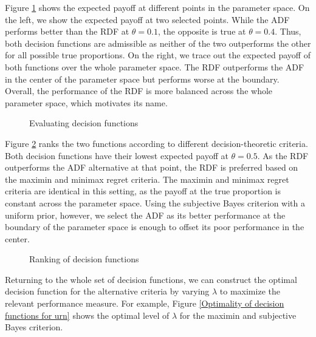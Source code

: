 Figure \ref{Measurement of performance} shows the expected payoff at different points in the parameter space. On the left, we show the expected payoff at two selected points. While the ADF performs better than the RDF at $\theta = 0.1$, the opposite is true at $\theta = 0.4$. Thus, both decision functions are admissible as neither of the two outperforms the other for all possible true proportions. On the right, we trace out the expected payoff of both functions over the whole parameter space. The RDF outperforms the ADF in the center of the parameter space but performs worse at the boundary. Overall, the performance of the RDF is more balanced across the whole parameter space, which motivates its name.

\begin{figure}[h!]\centering
{}\hspace{0.3cm}
\caption{Evaluating decision functions}\label{Measurement of performance}
\end{figure}\FloatBarrier

Figure \ref{Ranking of decision functions} ranks the two functions according to different decision-theoretic criteria. Both decision functions have their lowest expected payoff at $\theta = 0.5$. As the RDF outperforms the ADF alternative at that point, the RDF is preferred based on the maximin and minimax regret criteria. The maximin and minimax regret criteria are identical in this setting, as the payoff at the true proportion is constant across the parameter space. Using the subjective Bayes criterion with a uniform prior, however, we select the ADF as its better performance at the boundary of the parameter space is enough to offset its poor performance in the center.

\begin{figure}[h!]\centering
{}
\caption{Ranking of decision functions}\label{Ranking of decision functions}
\end{figure}\FloatBarrier

Returning to the whole set of decision functions, we can construct the optimal decision function for the alternative criteria by varying $\lambda$ to maximize the relevant performance measure. For example, Figure \ref{Optimality of decision functions for urn} shows the optimal level of $\lambda$ for the maximin and subjective Bayes criterion.

